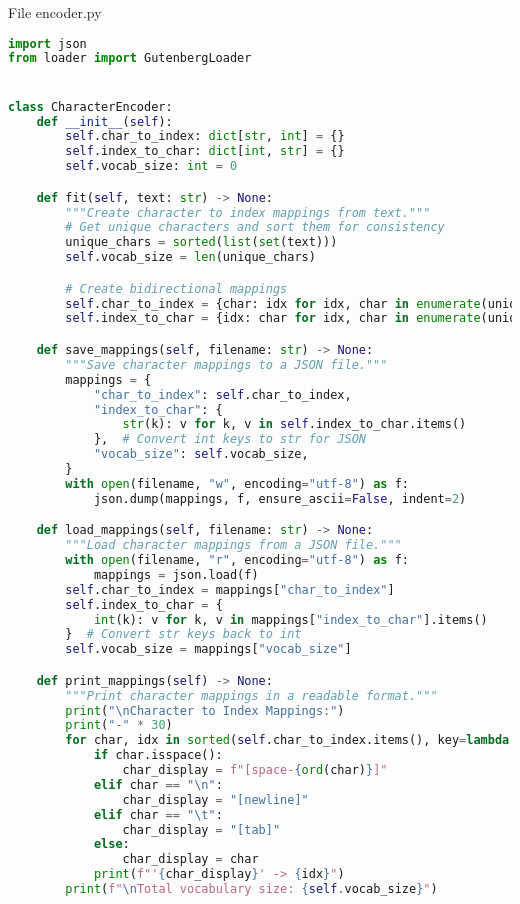 \documentclass[12pt]{article}
\begin{document}
File encoder.py
\begin{lstlisting}[language=Python]
import json
from loader import GutenbergLoader


class CharacterEncoder:
    def __init__(self):
        self.char_to_index: dict[str, int] = {}
        self.index_to_char: dict[int, str] = {}
        self.vocab_size: int = 0

    def fit(self, text: str) -> None:
        """Create character to index mappings from text."""
        # Get unique characters and sort them for consistency
        unique_chars = sorted(list(set(text)))
        self.vocab_size = len(unique_chars)

        # Create bidirectional mappings
        self.char_to_index = {char: idx for idx, char in enumerate(unique_chars)}
        self.index_to_char = {idx: char for idx, char in enumerate(unique_chars)}

    def save_mappings(self, filename: str) -> None:
        """Save character mappings to a JSON file."""
        mappings = {
            "char_to_index": self.char_to_index,
            "index_to_char": {
                str(k): v for k, v in self.index_to_char.items()
            },  # Convert int keys to str for JSON
            "vocab_size": self.vocab_size,
        }
        with open(filename, "w", encoding="utf-8") as f:
            json.dump(mappings, f, ensure_ascii=False, indent=2)

    def load_mappings(self, filename: str) -> None:
        """Load character mappings from a JSON file."""
        with open(filename, "r", encoding="utf-8") as f:
            mappings = json.load(f)
        self.char_to_index = mappings["char_to_index"]
        self.index_to_char = {
            int(k): v for k, v in mappings["index_to_char"].items()
        }  # Convert str keys back to int
        self.vocab_size = mappings["vocab_size"]

    def print_mappings(self) -> None:
        """Print character mappings in a readable format."""
        print("\nCharacter to Index Mappings:")
        print("-" * 30)
        for char, idx in sorted(self.char_to_index.items(), key=lambda x: x[1]):
            if char.isspace():
                char_display = f"[space-{ord(char)}]"
            elif char == "\n":
                char_display = "[newline]"
            elif char == "\t":
                char_display = "[tab]"
            else:
                char_display = char
            print(f"'{char_display}' -> {idx}")
        print(f"\nTotal vocabulary size: {self.vocab_size}")
\end{lstlisting}
\end{document}
